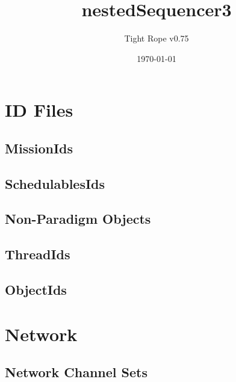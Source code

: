 \documentclass[10pt,a4paper]{article}
\title{nestedSequencer3}
\author{Tight Rope v0.75}
\date{\today}
\begin{document}
\maketitle

\section{ID Files}
\subsection{MissionIds}

\newpage

\subsection{SchedulablesIds}

\newpage

\subsection{Non-Paradigm Objects}
\newpage

\subsection{ThreadIds}

\newpage

\subsection{ObjectIds}

\newpage

\section{Network}
\subsection{Network Channel Sets}




{}
\end{document}
